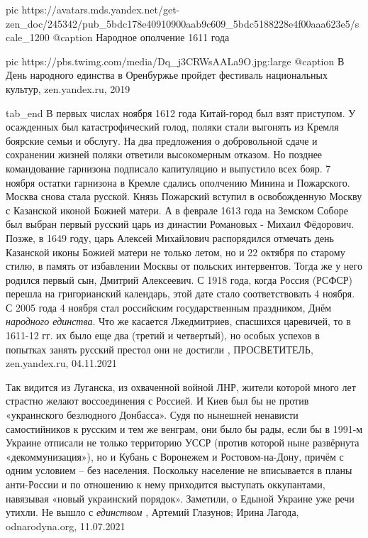      pic https://avatars.mds.yandex.net/get-zen_doc/245342/pub_5bdc178e40910900aab9c609_5bdc5188228e4f00aaa623e5/scale_1200
		 @caption Народное ополчение 1611 года

		 pic https://pbs.twimg.com/media/Dq_j3CRWsAALa9O.jpg:large
		 @caption В День народного единства в Оренбуржье пройдет фестиваль национальных культур, zen.yandex.ru, 2019

  tab_end
\fi
В первых числах ноября 1612 года Китай-город был взят приступом. У осажденных
был катастрофический голод, поляки стали выгонять из Кремля боярские семьи и
обслугу. На два предложения о добровольной сдаче и сохранении жизней поляки
ответили высокомерным отказом. Но позднее командование гарнизона подписало
капитуляцию и выпустило всех бояр. 7 ноября остатки гарнизона в Кремле сдались
ополчению Минина и Пожарского. Москва снова стала русской. Князь Пожарский
вступил в освобожденную Москву с Казанской иконой Божией матери. А в феврале
1613 года на Земском Соборе был выбран первый русский царь из династии
Романовых - Михаил Фёдорович. Позже, в 1649 году, царь Алексей Михайлович
распорядился отмечать день Казанской иконы Божией матери не только летом, но и
22 октября по старому стилю, в память от избавлении Москвы от польских
интервентов. Тогда же у него родился первый сын, Дмитрий Алексеевич. С 1918
года, когда Россия (РСФСР) перешла на григорианский календарь, этой дате стало
соответствовать 4 ноября. С 2005 года 4 ноября стал российским государственным
праздником, Днём \emph{народного единства}.  Что же касается Лжедмитриев,
спасшихся царевичей, то в 1611-12 гг. их было еще два (третий и четвертый), но
особых успехов в попытках занять русский престол они не достигли
, 
ПРОСВЕТИТЕЛЬ, zen.yandex.ru, 04.11.2021

Так видится из Луганска, из охваченной войной ЛНР, жители которой  много лет
страстно желают воссоединения с Россией. И Киев был бы не против «украинского
безлюдного Донбасса». Судя по нынешней ненависти самостийников к русским и тем
же венграм, они было бы рады, если бы в 1991-м Украине отписали не только
территорию УССР (против которой ныне развёрнута «декоммунизация»), но и Кубань
с Воронежем и Ростовом-на-Дону, причём с одним условием – без населения.
Поскольку население не вписывается в планы анти-России и по отношению к нему
приходится выступать оккупантами, навязывая «новый украинский порядок».
Заметили, о Едыной Украине уже речи утихли. Не вышло с \emph{единством}
, 
Артемий Глазунов; Ирина Лагода, odnarodyna.org, 11.07.2021
